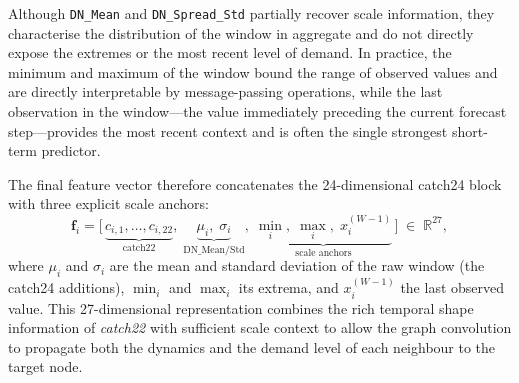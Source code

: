 Although \texttt{DN\_Mean} and \texttt{DN\_Spread\_Std} partially recover
scale information, they characterise the distribution of the window in
aggregate and do not directly expose the extremes or the most recent level of
demand.  In practice, the minimum and maximum of the window bound the range of
observed values and are directly interpretable by message-passing operations,
while the last observation in the window---the value immediately preceding the
current forecast step---provides the most recent context and is often the
single strongest short-term predictor.

The final feature vector therefore concatenates the 24-dimensional catch24
block with three explicit scale anchors:
\[
\mathbf{f}_i = \bigl[\,\underbrace{c_{i,1},\ldots,c_{i,22}}_{\text{catch22}},\;
\underbrace{\mu_i,\;\sigma_i}_{\text{DN\_Mean/Std}},\;
\underbrace{\min_i,\;\max_i,\;x_i^{(W-1)}}_{\text{scale anchors}}\,\bigr]
\;\in\;\mathbb{R}^{27},
\]
where $\mu_i$ and $\sigma_i$ are the mean and standard deviation of the raw
window (the catch24 additions), $\min_i$ and $\max_i$ its extrema, and
$x_i^{(W-1)}$ the last observed value.  This 27-dimensional representation
combines the rich temporal shape information of \textit{catch22} with
sufficient scale context to allow the graph convolution to propagate both the
dynamics and the demand level of each neighbour to the target node.

